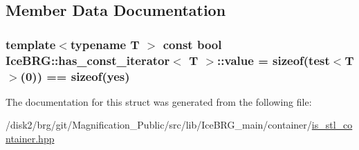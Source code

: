 \subsection{Member Data Documentation}
\hypertarget{structIceBRG_1_1has__const__iterator_a1eb21b02a08ba62ddb94c4fb8247f1db}{}
\subsubsection[{value}]{\setlength{\rightskip}{0pt plus 5cm}template$<$typename T $>$ const bool {\bf Ice\+B\+R\+G\+::has\+\_\+const\+\_\+iterator}$<$ T $>$\+::value = sizeof(test$<$T$>$(0)) == sizeof(yes)\hspace{0.3cm}{\ttfamily [static]}}\label{structIceBRG_1_1has__const__iterator_a1eb21b02a08ba62ddb94c4fb8247f1db}


The documentation for this struct was generated from the following file\+:\begin{DoxyCompactItemize}
\item 
/disk2/brg/git/\+Magnification\+\_\+\+Public/src/lib/\+Ice\+B\+R\+G\+\_\+main/container/\hyperlink{is__stl__container_8hpp}{is\+\_\+stl\+\_\+container.\+hpp}\end{DoxyCompactItemize}
